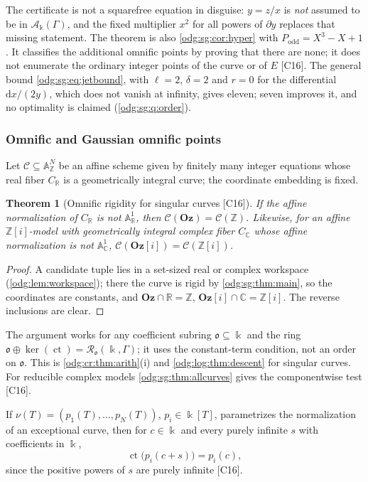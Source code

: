 \documentclass[11pt,oneside]{article}
\numberwithin{equation}{section}
\newtheorem{theorem}{Theorem}[section]
\theoremstyle{definition}
\theoremstyle{remark}
\newcommand{\Oz}{\mathbf{Oz}}
\newcommand{\Z}{\mathbb Z}
\newcommand{\R}{\mathbb R}
\newcommand{\C}{\mathbb C}
\newcommand{\ct}{\operatorname{ct}}
\newcommand{\src}[1]{\textup{\textsf{\small[#1]}}}
\newcommand{\Og}{\Oz[i]}
\newcommand{\crA}{\mathcal A_\Bbbk(\Gamma)}
\newcommand{\Aff}{\mathbb A}
\newcommand{\dif}{\mathrm d}
\begin{document}
The certificate is not a squarefree equation in disguise: $y=z/x$ is \emph{not} assumed to
be in $\crA$, and the fixed multiplier $x^2$ for all powers of $\partial y$ replaces that
missing statement. The theorem is also \cref{odg:sg:cor:hyper} with
$P_{\mathrm{odd}}=X^3-X+1$. It classifies the additional omnific points by proving that
there are none; it does not enumerate the ordinary integer points of the curve or of $E$
\src{C16}. The general bound \eqref{odg:sg:eq:jetbound}, with $\ell=2$, $\delta=2$ and
$r=0$ for the differential $\dif x/(2y)$, which does not vanish at infinity, gives eleven;
seven improves it, and no optimality is claimed (\cref{odg:sg:q:order}).

\subsubsection{Omnific and Gaussian omnific points}\label{odg:sg:sub:arith}

Let $\mathcal C\subseteq\Aff^N_\Z$ be an affine scheme given by finitely many integer
equations whose real fiber $C_\R$ is a geometrically integral curve; the coordinate
embedding is fixed.

\begin{theorem}[Omnific rigidity for singular curves \src{C16}]\label{odg:sg:thm:omnific}
If the affine normalization of $C_\R$ is not $\Aff^1_\R$, then
$\mathcal C(\Oz)=\mathcal C(\Z)$. Likewise, for an affine $\Z[i]$-model with geometrically
integral complex fiber $C_\C$ whose affine normalization is not $\Aff^1_\C$,
$\mathcal C(\Og)=\mathcal C(\Z[i])$.
\end{theorem}
\begin{proof}
A candidate tuple lies in a set-sized real or complex workspace (\cref{odg:lem:workspace});
there the curve is rigid by \cref{odg:sg:thm:main}, so the coordinates are constants, and
$\Oz\cap\R=\Z$, $\Og\cap\C=\Z[i]$. The reverse inclusions are clear.
\end{proof}

The argument works for any coefficient subring $\mathfrak o\subseteq\Bbbk$ and the ring
$\mathfrak o\oplus\ker(\ct)=\mathcal R_{\mathfrak o}(\Bbbk,\Gamma)$; it uses the constant-term
condition, not an order on $\mathfrak o$. This is \cref{odg:cr:thm:arith}(i) and
\cref{odg:log:thm:descent} for singular curves. For reducible complex models
\cref{odg:sg:thm:allcurves} gives the componentwise test \src{C16}.

If $\nu(T)=(p_1(T),\ldots,p_N(T))$, $p_i\in\Bbbk[T]$, parametrizes the normalization of an
exceptional curve, then for $c\in\Bbbk$ and every purely infinite $s$ with coefficients in
$\Bbbk$,
\begin{equation}\label{odg:sg:eq:arithfamily}
 \ct\bigl(p_i(c+s)\bigr)=p_i(c),
\end{equation}
since the positive powers of $s$ are purely infinite \src{C16}.
\end{document}
